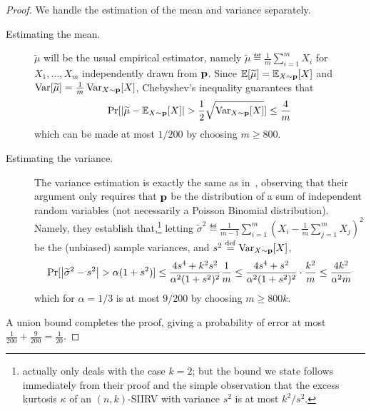 \begin{proof}We handle the estimation of the mean and variance separately.
\begin{description}
  \item[Estimating the mean.] $\widetilde{\mu}$ will be the usual empirical estimator, namely $\widetilde{\mu} \eqdef \frac{1}{m}\sum_{i=1}^m X_i$ for $X_1,\dots,X_m$ independently drawn from $\mathbf{p}$. Since $\mathbb{E}[\widetilde{\mu}]=\mathbb{E}_{X \sim \mathbf{p}}[X]$ and $\operatorname{Var}[\widetilde{\mu}]= \frac{1}{m}\operatorname{Var}_{X \sim \mathbf{p}}[X]$, Chebyshev's inequality guarantees that
  \[
      \Pr[ \left\lvert  \widetilde{\mu} - \mathbb{E}_{X \sim \mathbf{p}}[X]  \right\rvert >  \frac{1}{2}\sqrt{\operatorname{Var}_{X \sim \mathbf{p}}[X]}] \leq \frac{4}{m}
  \]
  which can be made at most $1/200$ by choosing $m\geq 800$.
  \item[Estimating the variance.] The variance estimation is exactly the same as in~\cite[Lemma 6]{DDS:PBD:15}, observing that their argument only requires that $\mathbf{p}$ be the distribution of a sum of independent random variables (not necessarily a Poisson Binomial distribution). Namely, they establish that,\footnote{\cite[Lemma 6]{DDS:PBD:15} actually only deals with the case $k=2$; but the bound we state follows immediately from their proof and the simple observation that the excess kurtosis $\kappa$ of an $(n,k)$-SIIRV with variance $s^2$ is at most ${k^2}/{s^2}$.} letting $\widetilde{\sigma}^2\eqdef\frac{1}{m-1}\sum_{i=1}^m (X_i-\frac{1}{m}\sum_{j=1}^m X_j)^2$ be the (unbiased) sample variances, and $s^2\stackrel{\rm def}{=} \operatorname{Var}_{X \sim \mathbf{p}}[X]$,
   \[
       \Pr[ \left\lvert  \widetilde{\sigma}^2 - s^2  \right\rvert > \alpha(1+s^2) ] \leq \frac{4s^4+k^2s^2}{\alpha^2(1+s^2)^2} \frac{1}{m}
       \leq \frac{4s^4+s^2}{\alpha^2(1+s^2)^2}\cdot  \frac{k^2}{m} \leq \frac{4k^2}{\alpha^2m}
   \]
   which for $\alpha=1/3$ is at most $9/200$ by choosing $m\geq 800k$.
\end{description}
A union bound completes the proof, giving a probability of error at most $\frac{1}{200}+\frac{9}{200}=\frac{1}{20}$.
\end{proof}

